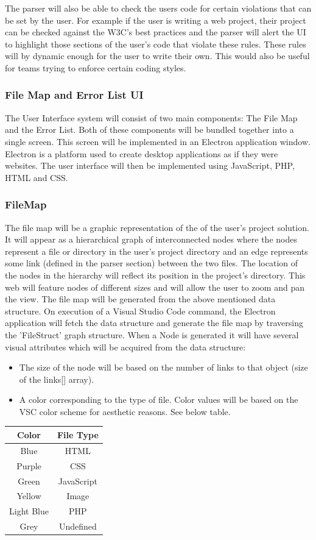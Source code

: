 \documentclass[letterpaper,10pt,titlepage,draftclsnofoot,onecolumn,onesided] {IEEEtran}
\begin{document}
The parser will also be able to check the users code for certain violations that can be set by the user.
For example if the user is writing a web project, their project can be checked against the W3C's best practices and the parser will alert the UI to highlight those sections of the user's code that violate these rules.
These rules will by dynamic enough for the user to write their own.
This would also be useful for teams trying to enforce certain coding styles.\cite{w3c}
	
\subsubsection{File Map and Error List UI}
The User Interface system will consist of two main components: The File Map and the Error List. 	
Both of these components will be bundled together into a single screen. 
This screen will be implemented in an Electron application window. 
Electron is a platform used to create desktop applications as if they were websites. \cite{Electron}
The user interface will then be implemented using JavaScript, PHP, HTML and CSS.
	
\subsubsection{FileMap}
The file map will be a graphic representation of the of the user's project solution. 
It will appear as a hierarchical graph of interconnected nodes where the nodes represent a file or directory in the user's project directory and an edge represents some link (defined in the parser section) between the two files.
The location of the nodes in the hierarchy will reflect its position in the project's directory.
This web will feature nodes of different sizes and will allow the user to zoom and pan the view.
The file map will be generated from the above mentioned data structure. 
On execution of a Visual Studio Code command, the Electron application will fetch the data structure and generate the file map by traversing the 'FileStruct' graph structure.
When a Node is generated it will have several visual attributes which will be acquired from the data structure:
	\begin{itemize}
	\item The size of the node will be based on the number of links to that object (size of the links[] array). 
	\item A color corresponding to the type of file. Color values will be based on the VSC color scheme for aesthetic reasons. 
	See below table.
	\end{itemize}
	\begin{tabular}{| c | c |}
	\hline
	Color & File Type\\
	\hline
	Blue & HTML\\
	Purple & CSS\\
	Green & JavaScript\\
	Yellow & Image\\
	Light Blue & PHP\\
	Grey & Undefined\\
	\hline
	\end{tabular}
	\\
	
\end{document}

